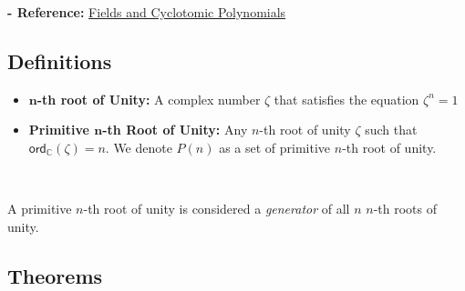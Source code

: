 \textbf{- Reference:} 
\href{https://e.math.cornell.edu/people/belk/numbertheory/CyclotomicPolynomials.pdf}{Fields and Cyclotomic Polynomials}~\cite{cyclotomic-polynomial}


\subsection{Definitions}
\label{subsec:roots-def}
\begin{tcolorbox}[title={\textbf{\tboxdef{\ref*{subsec:roots-def}} Definitions for Roots of Unity}}]
\begin{itemize}
\item \textbf{$\bm{n}$-th root of Unity:} A complex number $\zeta$ that satisfies the equation $\zeta^n = 1$
\item \textbf{Primitive $\bm{n}$-th Root of Unity:} Any $n$-th root of unity $\zeta$ such that $\textsf{ord}_{\mathbb{C}}(\zeta) = n$. We denote $P(n)$ as a set of primitive $n$-th root of unity. 
\end{itemize}

$ $

A primitive $n$-th root of unity is considered a \textit{generator} of all $n$ $n$-th roots of unity.
\end{tcolorbox}

\subsection{Theorems}
\label{subsec:roots-theorem}


